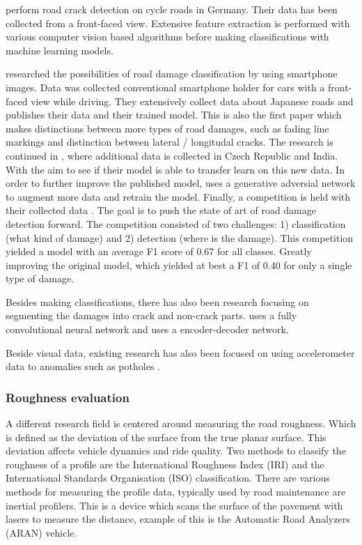  perform road crack detection on cycle roads in Germany. Their data has been collected from a front-faced view. Extensive feature extraction is performed with various computer vision based algorithms before making classifications with machine learning models. 

 researched the possibilities of road damage classification by using smartphone images. Data was collected conventional smartphone holder for cars with a front-faced view while driving. They extensively collect data about Japanese roads and publishes their data and their trained model. This is also the first paper which makes distinctions between more types of road damages, such as fading line markings and distinction between lateral / longitudal cracks. The research is continued in , where additional data is collected in Czech Republic and India. With the aim to see if their model is able to transfer learn on this new data. In order to further improve the published model,  uses a generative adversial network to augment more data and retrain the model. Finally, a competition is held with their collected data \cite{Arya2020-competition}. The goal is to push the state of art of road damage detection forward. The competition consisted of two challenges: 1) classification (what kind of damage) and 2) detection (where is the damage). This competition yielded a model with an average F1 score of 0.67 for all classes. Greatly improving the original model, which yielded at best a F1 of 0.40 for only a single type of damage.

Besides making classifications, there has also been research focusing on segmenting the damages into crack and non-crack parts.  uses a fully convolutional neural network and  uses a encoder-decoder network.


Beside visual data, existing research has also been focused on using accelerometer data to anomalies such as potholes \cite{Wu2020}.


\subsubsection{Roughness evaluation}
A different research field is centered around measuring the road roughness. Which is defined as the deviation of the surface from the true planar surface. This deviation affects vehicle dynamics and ride quality. Two methods to classify the roughness of a profile are the International Roughness Index (IRI) \cite{Sayers1986} and the International Standards Organisation (ISO) \cite{ISO8608} classification. There are various methods for measuring the profile data, typically used by road maintenance are inertial profilers. This is a device which scans the surface of the pavement with lasers to measure the distance, example of this is the Automatic Road Analyzers (ARAN) vehicle.

